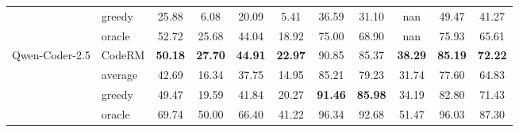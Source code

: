 \begin{table*}[!tbh]
{\begin{tabular}{llccccccccc}
        & greedy & 25.88 & 6.08 & 20.09 & 5.41 & 36.59 & 31.10 & nan & 49.47 & 41.27 \\
        & oracle & 52.72 & 25.68 & 44.04 & 18.92 & 75.00 & 68.90 & nan & 75.93 & 65.61 \\
        \midrule
        \multirow[c]{4}{*}{Qwen-Coder-2.5} & CodeRM & \bfseries 50.18 & \bfseries 27.70 & \bfseries 44.91 & \bfseries 22.97 & 90.85 & 85.37 & \bfseries 38.29 & \bfseries 85.19 & \bfseries 72.22 \\
        & average & 42.69 & 16.34 & 37.75 & 14.95 & 85.21 & 79.23 & 31.74 & 77.60 & 64.83 \\
        & greedy & 49.47 & 19.59 & 41.84 & 20.27 & \bfseries 91.46 & \bfseries 85.98 & 34.19 & 82.80 & 71.43 \\
        & oracle & 69.74 & 50.00 & 66.40 & 41.22 & 96.34 & 92.68 & 51.47 & 96.03 & 87.30 \\
        \bottomrule
        \end{tabular}
        }
\end{table*}


